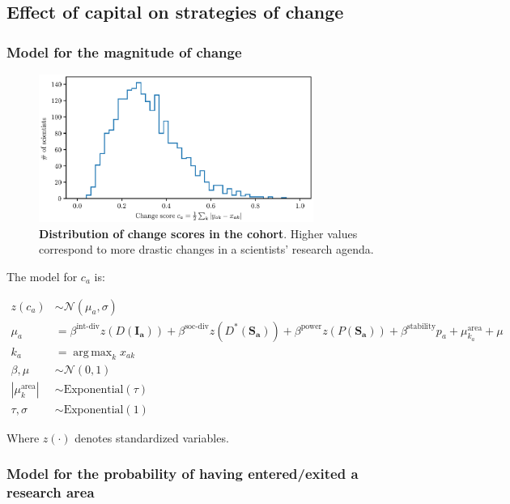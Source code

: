 \documentclass{article}
\DeclareMathOperator*{\argmax}{arg\,max}
\begin{document}
\subsection{Effect of capital on strategies of change}

\subsubsection{\label{appendix:change-model}Model for the magnitude of change}

\begin{figure}[h]
    \centering     \includegraphics[width=0.8\textwidth]{Fig15.eps}
    \caption{\textbf{Distribution of change scores in the cohort}. Higher values correspond to more drastic changes in a scientists' research agenda.}    
    \label{fig:change_scores}
\end{figure}

The model for $c_a$ is:

\begin{align*}
    z(c_a) &\sim \mathcal{N}(\mu_a,\sigma)\\
    \mu_a &= \beta^{\text{int-div}} z(D(\bm{I_a}))+\beta^{\text{soc-div}}z(D^{\ast}(\bm{S_a})) + \beta^{\text{power}} z(P(\bm{S_a})) + \beta^{\text{stability}} p_a   + \mu^{\text{area}}_{k_a} + \mu\\
    k_a &= \argmax_k x_{ak}\\
    \beta,\mu &\sim \mathcal{N}(0, 1)\\
    |\mu^{\text{area}}_k| &\sim \mathrm{Exponential}(\tau)\\
    \tau,\sigma &\sim \mathrm{Exponential}(1)
\end{align*}

Where $z(\cdot)$ denotes standardized variables.

\subsubsection{\label{appendix:enter-exit-model}Model for the probability of having  entered/exited a research area}
\end{document}
